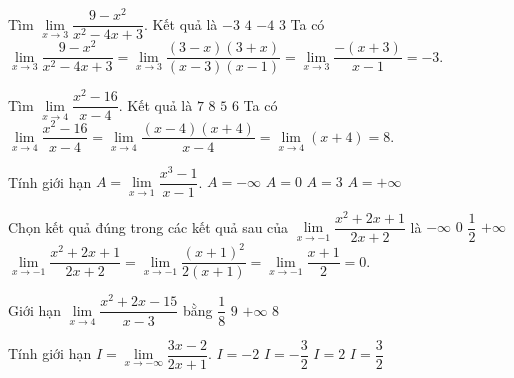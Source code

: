 \begin{ex}%
	Tìm $\lim\limits_{x\to 3} \dfrac {9-x^2}{x^2-4x+3}$. Kết quả là
	\choice
	{\True $-3$}
	{$4$}
	{$-4$}
	{$3$}
	\loigiai
	{Ta có $\lim\limits_{x\to 3} \dfrac {9-x^2}{x^2-4x+3}=\lim\limits_{x\to 3} \dfrac {(3-x)(3+x)}{(x-3)(x-1)}=\lim\limits_{x\to 3} \dfrac {-(x+3)}{x-1}=-3$.
	}
\end{ex}
\begin{ex}%
	Tìm $\lim\limits_{x\to 4} \dfrac {x^2-16}{x-4}$. Kết quả là
	\choice
	{$7$}
	{\True $8$}
	{$5$}
	{$6$}
	\loigiai
	{Ta có $\lim\limits_{x\to 4} \dfrac {x^2-16}{x-4}=\lim\limits_{x\to 4} \dfrac {(x-4)(x+4)}{x-4}=\lim\limits_{x\to 4} (x+4)=8$.
	}
\end{ex}
\begin{ex}%
	Tính giới hạn $A=\lim\limits_{x\to 1} \dfrac {x^3-1}{x-1}$.
	\choice
	{$A=-\infty $}
	{$A=0$}
	{\True $A=3$}
	{$A=+\infty $}
\end{ex}
\begin{ex}%
	Chọn kết quả đúng trong các kết quả sau của $\lim\limits_{x\to -1} \dfrac {x^2+2x+1}{2x+2}$ là
	\choice
	{$-\infty $}
	{\True $0$}
	{$\dfrac {1}{2}$}
	{$+\infty $}
	\loigiai
	{$\lim\limits_{x\to -1} \dfrac {x^2+2x+1}{2x+2}=\lim\limits_{x\to -1} \dfrac {(x+1)^2}{2(x+1)}=\lim\limits_{x\to -1} \dfrac {x+1}{2}=0$.
	}
\end{ex}
\begin{ex}%
	Giới hạn $\lim\limits_{x\to 4} \dfrac {x^2+2x-15}{x-3}$ bằng
	\choice
	{$\dfrac {1}{8}$}
	{\True $9$}
	{$+\infty $}
	{$8$}
\end{ex}
\begin{ex}%
	Tính giới hạn $I=\lim\limits_{x\to -\infty } \dfrac {3x-2}{2x+1}$.
	\choice
	{$I=-2$}
	{$I=-\dfrac {3}{2}$}
	{$I=2$}
	{\True $I=\dfrac {3}{2}$}
\end{ex}
